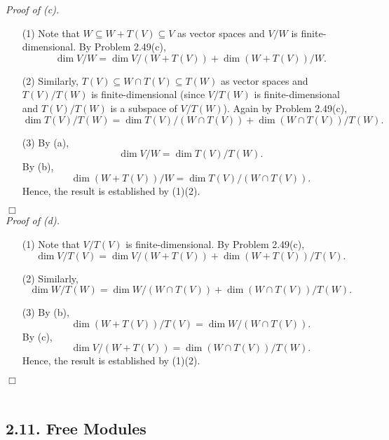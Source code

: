 \documentclass{article}
\begin{document}
\emph{Proof of (c).}
\begin{enumerate}
\item[(1)]
  Note that $W \subseteq W+T(V) \subseteq V$ as vector spaces
  and $V/W$ is finite-dimensional.
  By Problem 2.49(c),
  \[
    \dim V/W = \dim V/(W+T(V)) + \dim (W+T(V))/W.
  \]

\item[(2)]
  Similarly,
  $T(V) \subseteq W \cap T(V) \subseteq T(W)$ as vector spaces
  and $T(V)/T(W)$ is finite-dimensional
  (since $V/T(W)$ is finite-dimensional and $T(V)/T(W)$ is a subspace of $V/T(W)$).
  Again by Problem 2.49(c),
  \[
    \dim T(V)/T(W) = \dim T(V)/(W \cap T(V)) + \dim (W \cap T(V))/T(W).
  \]

\item[(3)]
  By (a),
  \[
    \dim V/W = \dim T(V)/T(W).
  \]
  By (b),
  \[
    \dim (W+T(V))/W = \dim T(V)/(W \cap T(V)).
  \]
  Hence, the result is established by (1)(2).
\end{enumerate}
$\Box$ \\



\emph{Proof of (d).}
\begin{enumerate}
\item[(1)]
  Note that $V/T(V)$ is finite-dimensional.
  By Problem 2.49(c),
  \[
    \dim V/T(V) = \dim V/(W+T(V)) + \dim (W+T(V))/T(V).
  \]

\item[(2)]
  Similarly,
  \[
    \dim W/T(W) = \dim W/(W \cap T(V)) + \dim (W \cap T(V))/T(W).
  \]

\item[(3)]
  By (b),
  \[
    \dim (W+T(V))/T(V) = \dim W/(W \cap T(V)).
  \]
  By (c),
  \[
    \dim V/(W+T(V)) = \dim (W \cap T(V))/T(W).
  \]
  Hence, the result is established by (1)(2).
\end{enumerate}
$\Box$ \\\\






\subsection*{2.11. Free Modules \\}
\end{document}
